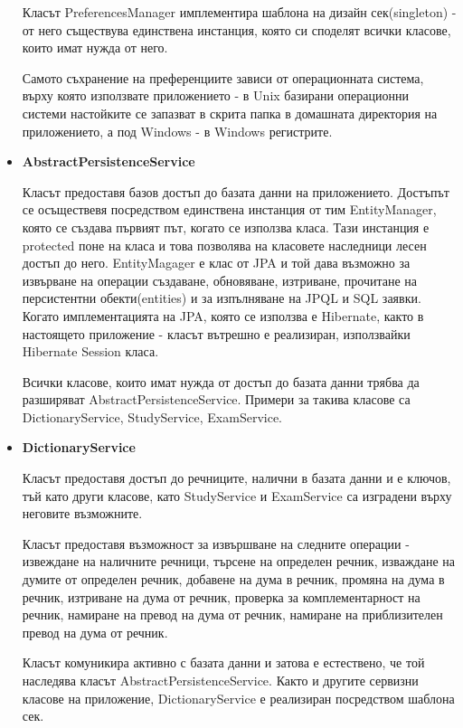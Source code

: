 \begin{itemize}
    Класът PreferencesManager имплементира шаблона на дизайн
    сек(singleton) - от него съществува единствена инстанция, която си
    споделят всички класове, които имат нужда от него. 

    Самото съхранение на преференциите зависи от операционната
    система, върху която използвате приложението - в Unix базирани
    операционни системи настойките се запазват в скрита папка в
    домашната директория на приложението, а под Windows - в Windows
    регистрите. 

  \item \textbf{AbstractPersistenceService}

    Класът предоставя базов достъп до базата данни на
    приложението. Достъпът се осъществевя посредством единствена
    инстанция от тим EntityManager, която се създава първият път,
    когато се използва класа. Тази инстанция е protected поне на класа
    и това позволява на класовете наследници лесен достъп до
    него. EntityMagager е клас от JPA и той дава възможно за
    извърване на операции създаване, обновяване, изтриване, прочитане
    на персистентни обекти(entities) и за изпълняване на JPQL и SQL
    заявки. Когато имплементацията на JPA, която се използва е
    Hibernate, както в настоящето приложение - класът вътрешно е
    реализиран, използвайки Hibernate Session класа.

    Всички класове, които имат нужда от достъп до базата данни трябва
    да разширяват AbstractPersistenceService. Примери за такива
    класове са DictionaryService, StudyService, ExamService.
  \item \textbf{DictionaryService}

    Класът предоставя достъп до речниците, налични в базата данни и е
    ключов, тъй като други класове, като StudyService и ExamService са
    изградени върху неговите възможните.

    Класът предоставя възможност за извършване на следните операции -
    извеждане на наличните речници, търсене на определен речник,
    изваждане на думите от определен речник, добавене на дума в
    речник, промяна на дума в речник, изтриване на дума от речник,
    проверка за комплементарност на речник, намиране на превод на дума
    от речник, намиране на приблизителен превод на дума от речник.

    Класът комуникира активно с базата данни и затова е естествено, че
    той наследява класът AbstractPersistenceService. Както и другите
    сервизни класове на приложение, DictionaryService е реализиран
    посредством шаблона сек. 


\end{itemize}
